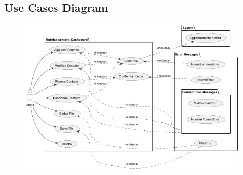 \documentclass[a4paper,12pt]{article}
\begin{document}
    \subsection {Use Cases Diagram}

    \begin{figure}[H]
        \centering
        \includegraphics[width=1\textwidth]{Use Cases.png}
        \label{fig:usecases-diagram}
    \end{figure}
\end{document}
